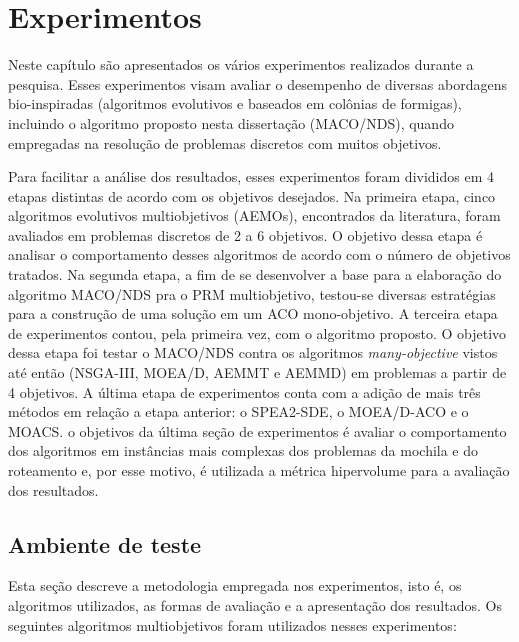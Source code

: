 \chapter[Experimentos]{Experimentos}
\label{chapter_experimentos}

Neste capítulo são apresentados os vários experimentos realizados durante a pesquisa. Esses experimentos visam avaliar o desempenho de diversas abordagens bio-inspiradas (algoritmos evolutivos e baseados em colônias de formigas), incluindo o algoritmo proposto nesta dissertação (MACO/NDS), quando empregadas na resolução de problemas discretos com muitos objetivos. 

Para facilitar a análise dos resultados, esses experimentos foram divididos em 4 etapas distintas de acordo com os objetivos desejados. Na primeira etapa, cinco algoritmos evolutivos multiobjetivos (AEMOs), encontrados da literatura, foram avaliados em problemas discretos de 2 a 6 objetivos. O objetivo dessa etapa é analisar o comportamento desses algoritmos de acordo com o número de objetivos tratados. Na segunda etapa, a fim de se desenvolver a base para a elaboração do algoritmo MACO/NDS pra o PRM multiobjetivo, testou-se diversas estratégias para a construção de uma solução em um ACO mono-objetivo. A terceira etapa de experimentos contou, pela primeira vez, com o algoritmo proposto. O objetivo dessa etapa foi testar o MACO/NDS contra os algoritmos \textit{many-objective} vistos até então (NSGA-III, MOEA/D, AEMMT e AEMMD) em problemas a partir de 4 objetivos. A última etapa de experimentos conta com a adição de mais três métodos em relação a etapa anterior: o SPEA2-SDE, o MOEA/D-ACO e o MOACS. o objetivos da última seção de experimentos é avaliar o comportamento dos algoritmos em instâncias mais complexas dos problemas da mochila e do roteamento e, por esse motivo, é utilizada a métrica hipervolume para a avaliação dos resultados.

\section{Ambiente de teste}

Esta seção descreve a metodologia empregada nos experimentos, isto é, os algoritmos utilizados, as formas de avaliação e a apresentação dos resultados. Os seguintes algoritmos multiobjetivos foram utilizados nesses experimentos:

